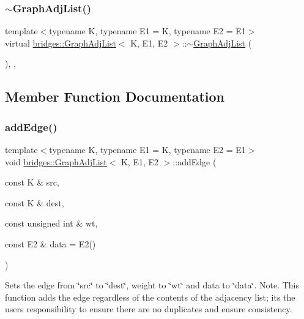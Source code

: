 \subsubsection{\texorpdfstring{$\sim$\+Graph\+Adj\+List()}{~GraphAdjList()}}
{\footnotesize\ttfamily template$<$typename K, typename E1 = K, typename E2 = E1$>$ \\
virtual \mbox{\hyperlink{classbridges_1_1_graph_adj_list}{bridges\+::\+Graph\+Adj\+List}}$<$ K, E1, E2 $>$\+::$\sim$\mbox{\hyperlink{classbridges_1_1_graph_adj_list}{Graph\+Adj\+List}} (\begin{DoxyParamCaption}{ }\end{DoxyParamCaption})\hspace{0.3cm}{\ttfamily [inline]}, {\ttfamily [override]}, {\ttfamily [virtual]}}



\subsection{Member Function Documentation}
\mbox{\label{classbridges_1_1_graph_adj_list_acd9a3bf8e544a6b78e75acd6bf1d57ee}} 
\subsubsection{\texorpdfstring{add\+Edge()}{addEdge()}}
{\footnotesize\ttfamily template$<$typename K, typename E1 = K, typename E2 = E1$>$ \\
void \mbox{\hyperlink{classbridges_1_1_graph_adj_list}{bridges\+::\+Graph\+Adj\+List}}$<$ K, E1, E2 $>$\+::add\+Edge (\begin{DoxyParamCaption}\item[{const K \&}]{src,  }\item[{const K \&}]{dest,  }\item[{const unsigned int \&}]{wt,  }\item[{const E2 \&}]{data = {\ttfamily E2()} }\end{DoxyParamCaption})\hspace{0.3cm}{\ttfamily [inline]}}

Sets the edge from \char`\"{}src\char`\"{} to \char`\"{}dest\char`\"{}, weight to \char`\"{}wt\char`\"{} and data to \char`\"{}data\char`\"{}. Note. This function adds the edge regardless of the contents of the adjacency list; its the user\textquotesingle{}s responsibility to ensure there are no duplicates and ensure consistency.


